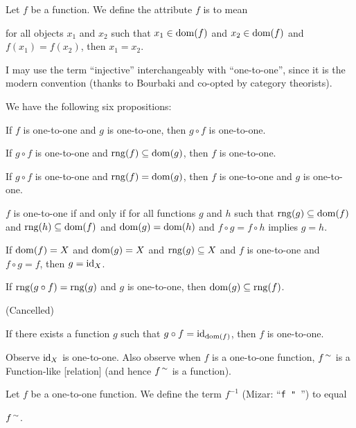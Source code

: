 \documentclass{article}
\begin{document}
\begin{definition}
Let $f$ be a function. We define the attribute $f$ is 
to mean
\begin{defn}
\item for all objects $x_{1}$ and $x_{2}$ such that $x_{1}\in\operatorname{dom}(f)$
  and $x_{2}\in\operatorname{dom}(f)$ and $f(x_{1})=f(x_{2})$, then $x_{1}=x_{2}$.
\end{defn}
\end{definition}

\begin{remark}
I may use the term ``injective'' interchangeably with ``one-to-one'',
since it is the modern convention (thanks to Bourbaki and co-opted by
category theorists).
\end{remark}

We have the following six propositions:
\begin{thm}
\item\label{funct1:24} If $f$ is one-to-one and $g$ is one-to-one, then
  $g\circ f$ is one-to-one.
\item\label{funct1:25} If $g\circ f$ is one-to-one and $\operatorname{rng}(f)\subseteq\operatorname{dom}(g)$,
  then $f$ is one-to-one.
\item\label{funct1:26} If $g\circ f$ is one-to-one and $\operatorname{rng}(f)=\operatorname{dom}(g)$,
  then $f$ is one-to-one and $g$ is one-to-one.
\item\label{funct1:27} $f$ is one-to-one if and only if for all
  functions $g$ and $h$ such that $\operatorname{rng}(g)\subseteq\operatorname{dom}(f)$ and
  $\operatorname{rng}(h)\subseteq\operatorname{dom}(f)$ and $\operatorname{dom}(g)=\operatorname{dom}(h)$ and $f\circ g=f\circ h$
  implies $g=h$.
\item\label{funct1:28} If $\operatorname{dom}(f)=X$ and $\operatorname{dom}(g)=X$ and
  $\operatorname{rng}(g)\subseteq X$ and $f$ is one-to-one and $f\circ g=f$, then $g=\operatorname{id}_{X}$.
\item\label{funct1:29} If $\operatorname{rng}(g\circ f)=\operatorname{rng}(g)$ and $g$ is
  one-to-one, then $\operatorname{dom}(g)\subseteq\operatorname{rng}(f)$.
\item\label{funct1:30} (Cancelled)
\item If there exists a function $g$ such that $g\circ f=\operatorname{id}_{\operatorname{dom}(f)}$,
  then $f$ is one-to-one.
\end{thm}

Observe $\operatorname{id}_{X}$ is one-to-one. Also observe when $f$ is a one-to-one
function, $f^{\,\sim}$ is a Function-like [relation] (and hence
$f^{\,\sim}$ is a function).

\begin{definition}
Let $f$ be a one-to-one function. We define the term $f^{-1}$ (Mizar:
``\verb#f " #'') to equal
\begin{defn}
\item $f^{\,\sim}$.
\end{defn}
\end{definition}
\end{document}
